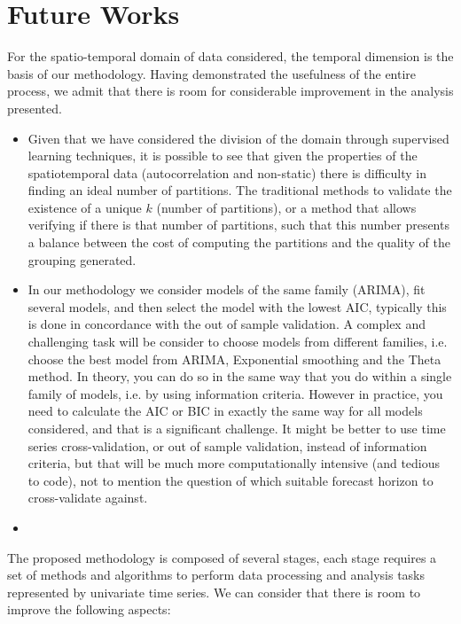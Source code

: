 \section{Future Works}

For the spatio-temporal domain of data considered, the temporal dimension is the basis of our methodology. Having demonstrated the usefulness of the entire process, we admit that there is room for considerable improvement in the analysis presented. 

\begin{itemize}
	\item Given that we have considered the division of the domain through supervised learning techniques, it is possible to see that given the properties of the spatiotemporal data (autocorrelation and non-static) there is difficulty in finding an ideal number of partitions. The traditional methods to validate the existence of a unique $k$ (number of partitions),  or a method that allows verifying if there is that number of partitions, such that this number presents a balance between the cost of computing the partitions and the quality of the grouping generated. 
	
	\item In our methodology we consider models of the same family (ARIMA), fit several models, and then select the model with the lowest AIC, typically this is done in concordance with the out of sample validation. A complex and challenging task will be consider to choose models from different families, i.e. choose the best model from ARIMA, Exponential smoothing and the Theta method. In theory, you can do so in the same way that you do within a single family of models, i.e. by using information criteria. However in practice, you need to calculate the AIC or BIC in exactly the same way for all models considered, and that is a significant challenge. It might be better to use time series cross-validation, or out of sample validation, instead of information criteria, but that will be much more computationally intensive (and tedious to code), not to mention the question of which suitable forecast horizon to cross-validate against.
	
	\item 
\end{itemize}

The proposed methodology is composed of several stages, each stage requires a set of methods and algorithms to perform data processing and analysis tasks represented by univariate time series. We can consider that there is room to improve the following aspects:

